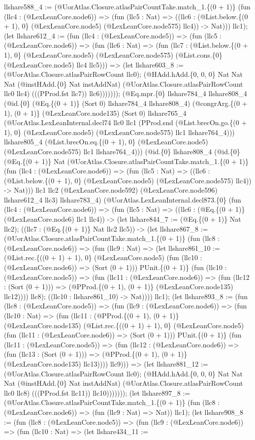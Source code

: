 \documentclass[11pt]{article}
\begin{document}
llshare588\_4 := (@UorAtlas.Closure.atlasPairCountTake.match\_1.\{(0 + 1)\} (fun (llc4 : (@LexLeanCore.node6)) => (fun (llc5 : Nat) => ((llc6 : (@List.below.\{(0 + 1), 0\} (@LexLeanCore.node5) (@LexLeanCore.node575) llc4)) -> Nat))) llc1); (let llshare612\_4 := (fun (llc4 : (@LexLeanCore.node5)) => (fun (llc5 : (@LexLeanCore.node6)) => (fun (llc6 : Nat) => (fun (llc7 : (@List.below.\{(0 + 1), 0\} (@LexLeanCore.node5) (@LexLeanCore.node575) (@List.cons.\{0\} (@LexLeanCore.node5) llc4 llc5))) => (let llshare603\_8 := (@UorAtlas.Closure.atlasPairRowCount llc0); (@HAdd.hAdd.\{0, 0, 0\} Nat Nat Nat (@instHAdd.\{0\} Nat instAddNat) (@UorAtlas.Closure.atlasPairRowCount llc0 llc4) (((PProd.fst llc7)) llc6))))))); (@Eq.mpr.\{0\} llshare784\_4 llshare808\_4 (@id.\{0\} (@Eq.\{(0 + 1)\} (Sort 0) llshare784\_4 llshare808\_4) (@congrArg.\{(0 + 1), (0 + 1)\} (@LexLeanCore.node135) (Sort 0) llshare765\_4 (@UorAtlas.LexLeanInternal.decl74 llc0 llc1 (PProd.snd (@List.brecOn.go.\{(0 + 1), 0\} (@LexLeanCore.node5) (@LexLeanCore.node575) llc1 llshare764\_4))) llshare805\_4 (@List.brecOn.eq.\{(0 + 1), 0\} (@LexLeanCore.node5) (@LexLeanCore.node575) llc1 llshare764\_4))) (@id.\{0\} llshare808\_4 (@id.\{0\} (@Eq.\{(0 + 1)\} Nat (@UorAtlas.Closure.atlasPairCountTake.match\_1.\{(0 + 1)\} (fun (llc4 : (@LexLeanCore.node6)) => (fun (llc5 : Nat) => ((llc6 : (@List.below.\{(0 + 1), 0\} (@LexLeanCore.node5) (@LexLeanCore.node575) llc4)) -> Nat))) llc1 llc2 (@LexLeanCore.node592) (@LexLeanCore.node596) llshare612\_4 llc3) llshare783\_4) (@UorAtlas.LexLeanInternal.decl873.\{0\} (fun (llc4 : (@LexLeanCore.node6)) => (fun (llc5 : Nat) => ((llc6 : (@Eq.\{(0 + 1)\} (@LexLeanCore.node6) llc1 llc4)) -> (let llshare844\_7 := (@Eq.\{(0 + 1)\} Nat llc2); ((llc7 : (@Eq.\{(0 + 1)\} Nat llc2 llc5)) -> (let llshare867\_8 := (@UorAtlas.Closure.atlasPairCountTake.match\_1.\{(0 + 1)\} (fun (llc8 : (@LexLeanCore.node6)) => (fun (llc9 : Nat) => (let llshare861\_10 := (@List.rec.\{((0 + 1) + 1), 0\} (@LexLeanCore.node5) (fun (llc10 : (@LexLeanCore.node6)) => (Sort (0 + 1))) PUnit.\{(0 + 1)\} (fun (llc10 : (@LexLeanCore.node5)) => (fun (llc11 : (@LexLeanCore.node6)) => (fun (llc12 : (Sort (0 + 1))) => (@PProd.\{(0 + 1), (0 + 1)\} (@LexLeanCore.node135) llc12)))) llc8); ((llc10 : llshare861\_10) -> Nat)))) llc1); (let llshare893\_8 := (fun (llc8 : (@LexLeanCore.node5)) => (fun (llc9 : (@LexLeanCore.node6)) => (fun (llc10 : Nat) => (fun (llc11 : (@PProd.\{(0 + 1), (0 + 1)\} (@LexLeanCore.node135) (@List.rec.\{((0 + 1) + 1), 0\} (@LexLeanCore.node5) (fun (llc11 : (@LexLeanCore.node6)) => (Sort (0 + 1))) PUnit.\{(0 + 1)\} (fun (llc11 : (@LexLeanCore.node5)) => (fun (llc12 : (@LexLeanCore.node6)) => (fun (llc13 : (Sort (0 + 1))) => (@PProd.\{(0 + 1), (0 + 1)\} (@LexLeanCore.node135) llc13)))) llc9))) => (let llshare881\_12 := (@UorAtlas.Closure.atlasPairRowCount llc0); (@HAdd.hAdd.\{0, 0, 0\} Nat Nat Nat (@instHAdd.\{0\} Nat instAddNat) (@UorAtlas.Closure.atlasPairRowCount llc0 llc8) (((PProd.fst llc11)) llc10))))))); (let llshare897\_8 := (@UorAtlas.Closure.atlasPairCountTake.match\_1.\{(0 + 1)\} (fun (llc8 : (@LexLeanCore.node6)) => (fun (llc9 : Nat) => Nat)) llc1); (let llshare908\_8 := (fun (llc8 : (@LexLeanCore.node5)) => (fun (llc9 : (@LexLeanCore.node6)) => (fun (llc10 : Nat) => (let llshare434\_11 := 
\end{document}
